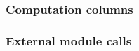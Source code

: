 \subsubsection{Computation columns   \lispDone{}}    \label{mxp: columns: scenario: columns}            
\subsubsection{External module calls \lispDone{}}    \label{mxp: columns: computations: module calls}   
